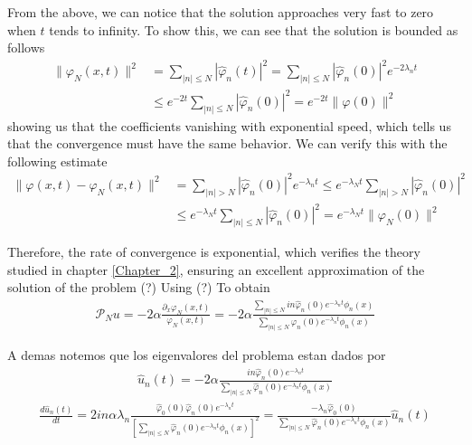 	From the above, we can notice that the solution approaches very fast to zero when $ t $ tends to infinity. To show this, we can see that the solution is bounded as follows
	\begin{align*}
		\| \varphi_N (x, t) \|^2 &= \displaystyle \sum_{ |n| \leq N} | \hat{\varphi}_n (t) |^2 = \sum_{ |n| \leq N} | \hat{\varphi}_n (0) |^2 e^{-2 \lambda_n t} \\
		&\leq e^{- 2 t} \sum_{ |n| \leq N} | \hat{\varphi}_n (0) |^2 = e^{- 2t} \| \varphi (0) \|^2 
	\end{align*}
	showing us that the coefficients vanishing with exponential speed, which tells us that the convergence must have the same behavior. We can verify this with the following estimate
	\begin{align*}
		\| \varphi(x, t) - \varphi_N (x, t) \|^2 &= \displaystyle \sum_{ |n| > N} | \hat{\varphi}_n (0) |^2 e^{-\lambda_n t} \leq e^{-\lambda_N t} \sum_{ |n| > N} | \hat{\varphi}_n (0) |^2 \\
		&\leq e^{-\lambda_N t} \sum_{ |n| \leq N} | \hat{\varphi}_n (0) |^2 = e^{-\lambda_N t} \|\varphi_N (0) \|^2 
	\end{align*}
	
	Therefore, the rate of convergence is exponential, which verifies the theory studied in chapter \ref{Chapter_2}, ensuring an excellent approximation of the solution of the problem (?) Using (?) To obtain
	\begin{align*}
		\mathcal{P}_N u  = - 2 \alpha \frac{\partial_x \varphi_N (x, t)}{ \varphi_N (x, t)} = - 2 \alpha \frac{\displaystyle \sum_{ |n| \leq N} in \hat{\varphi}_n (0) e^{- \lambda_n t}  \phi_n (x) }{\displaystyle \sum_{|n| \leq N} \hat{\varphi}_n (0) e^{- \lambda_n t}  \phi_n (x)}
	\end{align*}

	A demas notemos que los eigenvalores del problema estan dados por 
	\begin{align*}
		\hat{u}_n (t) = - 2 \alpha \frac{in \hat{\varphi}_n (0) e^{- \lambda_n t} }{\displaystyle \sum_{|n| \leq N} \hat{\varphi}_n (0) e^{- \lambda_n t}  \phi_n (x)}
	\end{align*}
	\begin{align*}
		\frac{d \hat{u}_n (t)}{dt} = 2 in \alpha \lambda_n \frac{ \hat{\varphi}_0 (0) \hat{\varphi}_n (0) e^{- \lambda_n t} }{\displaystyle \left[ \sum_{|n| \leq N} \hat{\varphi}_n (0) e^{- \lambda_n t}  \phi_n (x) \right]^2} =  \frac{ - \lambda_n \hat{\varphi}_0 (0) }{\displaystyle \sum_{|n| \leq N} \hat{\varphi}_n (0) e^{- \lambda_n t}  \phi_n (x)} \hat{u}_n (t) 
	\end{align*}	
